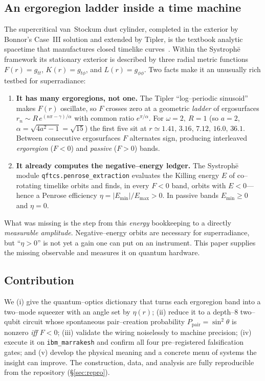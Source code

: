 \documentclass[11pt]{article}
\newcommand{\Ppair}{P_{\mathrm{pair}}}
\newcommand{\Emin}{E_{\min}}
\newcommand{\Emax}{E_{\max}}
\newcommand{\code}[1]{\texttt{\small #1}}
\begin{document}
\subsection{An ergoregion ladder inside a time machine}
The supercritical van~Stockum dust cylinder, completed in the exterior by Bonnor's Case~III
solution and extended by Tipler, is the textbook analytic spacetime that manufactures closed
timelike curves~\cite{vanstockum1937,bonnor1980,tipler1974}. Within the
Systroph\=e framework its stationary exterior is described by three radial metric functions
$F(r)=g_{tt}$, $K(r)=g_{t\phi}$, and $L(r)=g_{\phi\phi}$. Two facts make it an unusually rich
testbed for superradiance:
\begin{enumerate}[nosep]
\item \textbf{It has many ergoregions, not one.} The Tipler ``log--periodic sinusoid'' makes
$F(r)$ oscillate, so $F$ crosses zero at a geometric \emph{ladder} of ergosurfaces
$r_n\sim R\,e^{(n\pi-\gamma)/\alpha}$ with common ratio $e^{\pi/\alpha}$. For $\omega=2,\ R=1$
(so $a=2$, $\alpha=\sqrt{4a^2-1}=\sqrt{15}$) the first five sit at
$r\simeq 1.41,\,3.16,\,7.12,\,16.0,\,36.1$. Between consecutive ergosurfaces $F$ alternates sign,
producing interleaved \emph{ergoregion} ($F<0$) and \emph{passive} ($F>0$) bands.
\item \textbf{It already computes the negative--energy ledger.} The Systroph\=e module
\code{qftcs.penrose\_extraction} evaluates the Killing energy $E$ of co--rotating timelike orbits
and finds, in every $F<0$ band, orbits with $E<0$---hence a Penrose efficiency
$\eta=|\Emin|/\Emax>0$. In passive bands $\Emin\ge 0$ and $\eta=0$.
\end{enumerate}
What was missing is the step from this \emph{energy} bookkeeping to a directly \emph{measurable
amplitude}. Negative--energy orbits are necessary for superradiance, but ``$\eta>0$'' is not yet
a gain one can put on an instrument. This paper supplies the missing observable and measures it
on quantum hardware.

\subsection{Contribution}
We (i) give the quantum--optics dictionary that turns each ergoregion band into a two--mode
squeezer with an angle set by $\eta(r)$; (ii) reduce it to a depth--8 two--qubit circuit whose
spontaneous pair--creation probability $\Ppair=\sin^2\theta$ is nonzero \emph{iff} $F<0$; (iii)
validate the wiring noiselessly to machine precision; (iv) execute it on
\code{ibm\_marrakesh} and confirm all four pre--registered falsification gates; and (v) develop
the physical meaning and a concrete menu of systems the insight can improve. The construction,
data, and analysis are fully reproducible from the repository
(\S\ref{sec:repro}).
\end{document}
